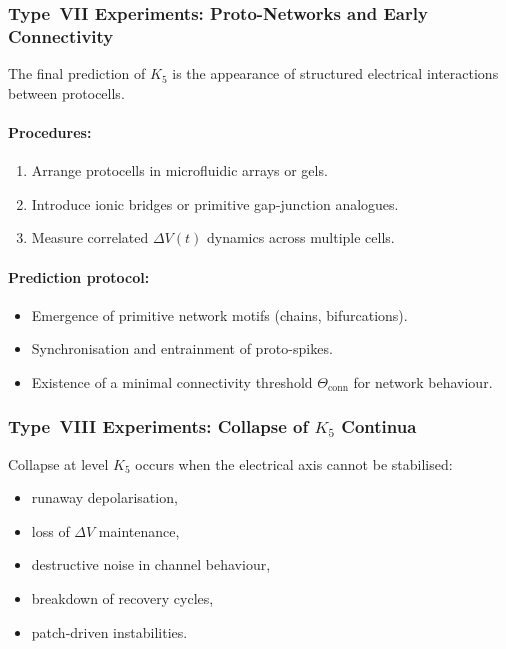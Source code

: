 \subsubsection{Type~VII Experiments: Proto-Networks and Early Connectivity}

The final prediction of $K_5$ is the appearance of structured
electrical interactions between protocells.

\paragraph{Procedures:}

\begin{enumerate}
    \item Arrange protocells in microfluidic arrays or gels.
    \item Introduce ionic bridges or primitive gap-junction analogues.
    \item Measure correlated $\Delta V(t)$ dynamics across multiple cells.
\end{enumerate}

\paragraph{Prediction protocol:}

\begin{itemize}
    \item Emergence of primitive network motifs (chains, bifurcations).
    \item Synchronisation and entrainment of proto-spikes.
    \item Existence of a minimal connectivity threshold
          $\Theta_{\mathrm{conn}}$ for network behaviour.
\end{itemize}



\subsubsection{Type~VIII Experiments: Collapse of \texorpdfstring{$K_5$}{K5} Continua}

Collapse at level $K_5$ occurs when the electrical axis
cannot be stabilised:

\begin{itemize}
    \item runaway depolarisation,
    \item loss of $\Delta V$ maintenance,
    \item destructive noise in channel behaviour,
    \item breakdown of recovery cycles,
    \item patch-driven instabilities.
\end{itemize}

